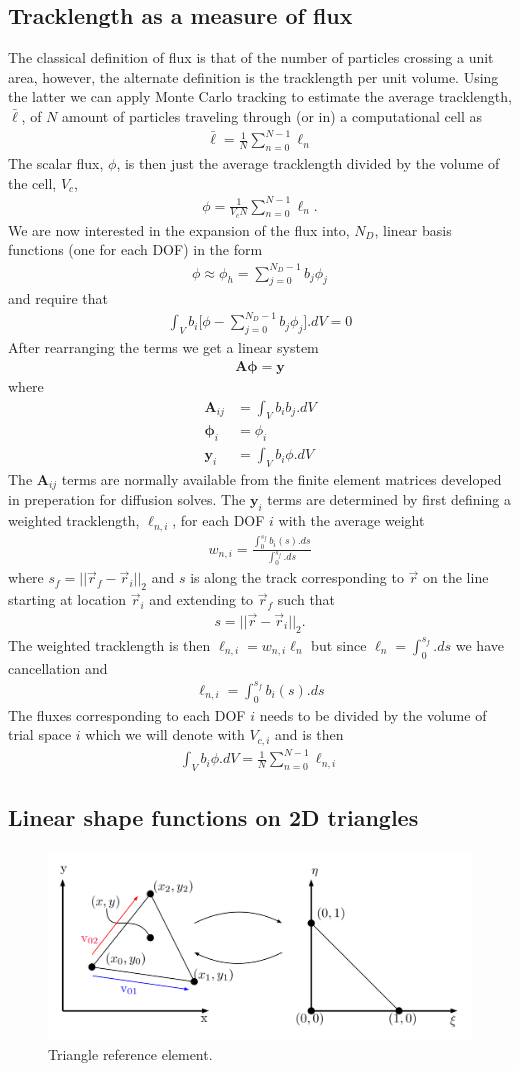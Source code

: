 \documentclass[10pt,letterpaper,notitlepage]{article}
\numberwithin{equation}{section}
\newcommand{\beq}{\begin{equation*}
\begin{aligned}}
\newcommand{\eeq}{\end{aligned}
\end{equation*}}
\newcommand{\beqn}{\begin{equation}
	\begin{aligned}}
\newcommand{\eeqn}{\end{aligned}
	\end{equation}}
\begin{document}
\subsection{Tracklength as a measure of flux}
The classical definition of flux is that of the number of particles crossing a unit area, however, the alternate definition is the tracklength per unit volume. Using the latter we can apply Monte Carlo tracking to estimate the average tracklength, $\bar{\ell}$, of $N$ amount of particles traveling through (or in) a  computational cell as
\beqn
\bar{\ell} = \frac{1}{N} \sum_{n=0}^{N-1} \ell_n
\eeqn 
\noindent
The scalar flux, $\phi$, is then just the average tracklength divided by the volume of the cell, $V_c$, 
\beqn
\phi = \frac{1}{V_c N} \sum_{n=0}^{N-1} \ell_n.
\eeqn 
We are now interested in the expansion of the flux into, $N_D$, linear basis functions (one for each DOF) in the form
\beqn 
\phi \approx \phi_h= \sum_{j=0}^{N_{D}-1} b_j \phi_j
\eeqn 
and require that
\beqn
\int_V b_i \biggr[
\phi  - \sum_{j=0}^{N_{D}-1} b_j \phi_j
\biggr].dV = 0
\eeqn 
After rearranging the terms we get a linear system
\beqn
\mathbf{A} \mathbf{\phi} = \mathbf{y} 
\eeqn 
where
\beq
 \mathbf{A} _{ij} &= \int_V b_i b_j .dV \\
\mathbf{\phi}_i &= \phi_i \\
\mathbf{y}_i &= \int_V b_i \phi .dV
\eeq 
The $\mathbf{A} _{ij} $ terms are normally available from the finite element matrices developed in preperation for diffusion solves. The $\mathbf{y}_i$ terms are determined by first defining a weighted tracklength, $\ell_{n,i}$, for each DOF $i$ with the average weight
\beqn
w_{n,i} = \frac
{\displaystyle \int_{0}^{s_f} b_i (s) .ds}
{\displaystyle \int_{0}^{s_f} .ds}
\eeqn 
where $s_f = ||\vec{r}_f  - \vec{r}_i||_2$ and  $s$ is along the track corresponding to $\vec{r}$ on the line starting at location $\vec{r}_i$ and extending to $\vec{r}_f$ such that
\beqn
s = ||\vec{r}  - \vec{r}_i||_2.
\eeqn 
\noindent 
The weighted tracklength is then $\ell_{n,i} = w_{n,i} \ell_n$ but since $\ell_n = \int_{0}^{s_f} .ds$ we have cancellation and
\beqn
\ell_{n,i} = \int_{0}^{s_f} b_i (s) .ds
\eeqn 
\noindent
The fluxes corresponding to each DOF $i$ needs to be divided by the volume of trial space $i$ which we will denote with $V_{c,i}$ and is then
\beqn 
\int_V b_i \phi.dV = \frac{1}{N} \sum_{n=0}^{N-1} \ell_{n,i}
\eeqn 


\subsection{Linear shape functions on 2D triangles}
\begin{figure}[H]
\centering
\includegraphics[width=0.7\linewidth]{figures/TwoD_ReferenceElement}
\caption{Triangle reference element.}
\label{fig:twodreferenceelement}
\end{figure}
\end{document}
